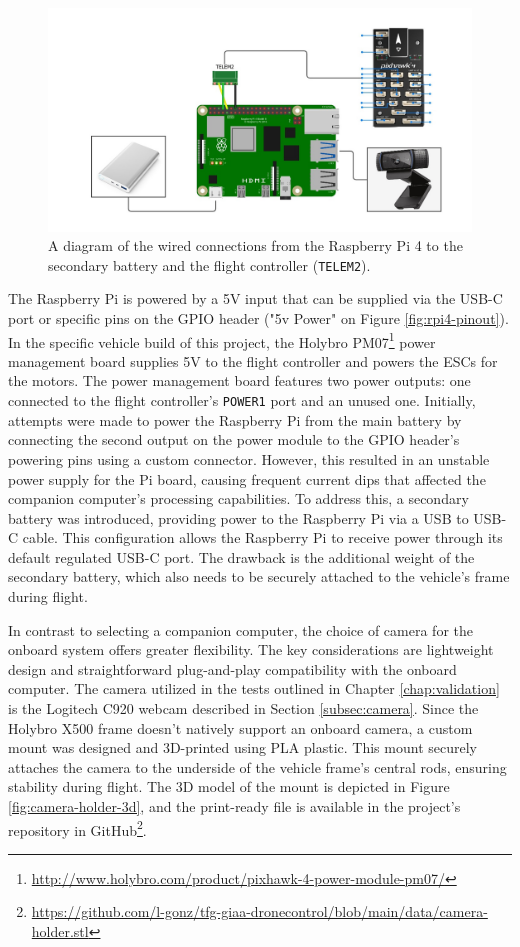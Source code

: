 \begin{figure}
  \centering
  \includegraphics[width=\textwidth,keepaspectratio]{img/wiring-diagram.jpg}
  \caption{A diagram of the wired connections from the Raspberry Pi 4 to the secondary battery and the flight controller (\texttt{TELEM2}).}
  \label{fig:wiring}
\end{figure}

The Raspberry Pi is powered by a 5V input that can be supplied via the USB-C port or specific pins on the GPIO header ("5v Power" on Figure \ref{fig:rpi4-pinout}). 
In the specific vehicle build of this project, the Holybro PM07\footnote{\url{http://www.holybro.com/product/pixhawk-4-power-module-pm07/}} power management board supplies 5V to the flight controller and powers the ESCs for the motors. 
The power management board features two power outputs: one connected to the flight controller's \texttt{POWER1} port and an unused one. 
Initially, attempts were made to power the Raspberry Pi from the main battery by connecting the second output on the power module to the GPIO header's powering pins using a custom connector. 
However, this resulted in an unstable power supply for the Pi board, causing frequent current dips that affected the companion computer's processing capabilities. 
To address this, a secondary battery was introduced, providing power to the Raspberry Pi via a USB to USB-C cable. 
This configuration allows the Raspberry Pi to receive power through its default regulated USB-C port. 
The drawback is the additional weight of the secondary battery, which also needs to be securely attached to the vehicle's frame during flight.

In contrast to selecting a companion computer, the choice of camera for the onboard system offers greater flexibility. The key considerations are lightweight design and straightforward plug-and-play compatibility with the onboard computer. The camera utilized in the tests outlined in Chapter \ref{chap:validation} is the Logitech C920 webcam described in Section \ref{subsec:camera}. Since the Holybro X500 frame doesn't natively support an onboard camera, a custom mount was designed and 3D-printed using PLA plastic. This mount securely attaches the camera to the underside of the vehicle frame's central rods, ensuring stability during flight. The 3D model of the mount is depicted in Figure \ref{fig:camera-holder-3d}, and the print-ready file is available in the project's repository in GitHub\footnote{\url{https://github.com/l-gonz/tfg-giaa-dronecontrol/blob/main/data/camera-holder.stl}}.


